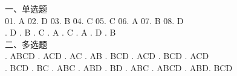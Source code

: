 \documentclass[a4paper]{article}
\begin{document}
\begin{tabbing}
一、单选题\\
\= 01. A \qquad \= 02. D \qquad \= 03. B \qquad \= 04. C \qquad \= 05. C \qquad \= 06. A \qquad \= 07. B \qquad \= 08. D \qquad \= \\
. D . B . C . A . C . A . D . B\\
二、多选题\\
. ABCD . ACD  . AC   . AB   . BCD  . ACD  . BCD  . ACD\\
. BCD  . BC   . ABC  . ABD  . BD   . ABC  . ABCD . ABD. BCD\\
\end{tabbing}
\end{document}
